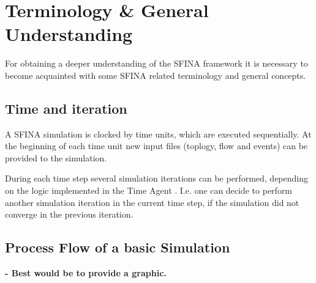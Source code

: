 \documentclass[11pt,fleqn]{book} %
\newcommand{\TimeAgent}{Time Agent }
\begin{document}
\chapter{Terminology \& General Understanding}
For obtaining a deeper understanding of the SFINA framework it is necessary to become acquainted with some SFINA related terminology and general concepts.


\section{Time and iteration}
A SFINA simulation is clocked by time units, which are executed sequentially. At the beginning of each time unit new input files (toplogy, flow and events) can be provided to the simulation.

During each time step several simulation iterations can be performed, depending on the logic implemented in the \TimeAgent . I.e. one can decide to perform another simulation iteration in the current time step, if the simulation did not converge in the previous iteration. 

\section{Process Flow of a basic Simulation }
\textbf{- Best would be to provide a graphic.}
\end{document}
